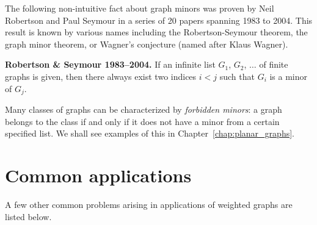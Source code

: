 The following non-intuitive fact about graph minors was proven by
Neil Robertson and Paul Seymour in a series of 20 papers spanning 1983
to 2004. This result is known by various names including the
Robertson-Seymour theorem, the graph minor theorem, or Wagner's
conjecture (named after Klaus Wagner).

\begin{theorem}
\label{thm:introduction:graph_minor}
\textbf{Robertson \& Seymour 1983--2004.}
If an infinite list $G_1$, $G_2$, $\dots$ of finite graphs is given,
then there always exist two indices $i < j$ such that $G_i$ is a minor
of $G_j$.
\end{theorem}

Many classes of graphs can be characterized by
\emph{forbidden minors}: a graph belongs to the class if and only if
it does not have a minor from a certain specified list. We shall see
examples of this in Chapter~\ref{chap:planar_graphs}.



\section{Common applications}

A few other common problems arising in applications of weighted graphs
are listed below.

